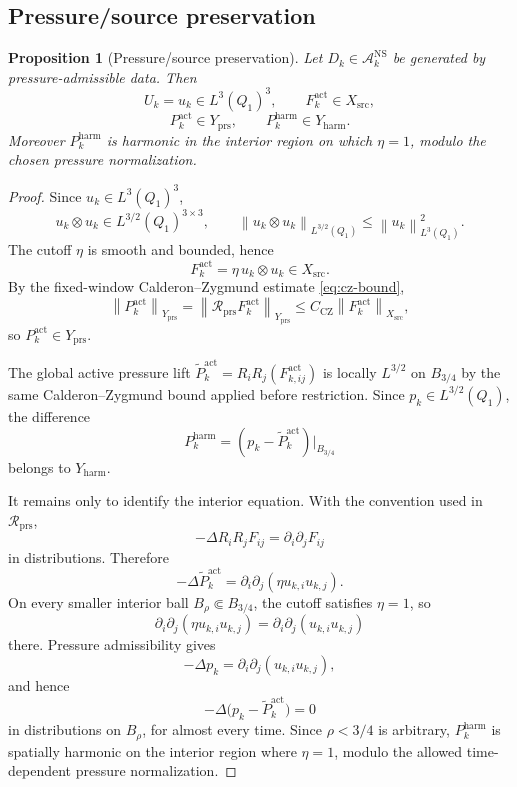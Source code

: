 \documentclass[11pt]{article}
\numberwithin{equation}{section}
\theoremstyle{plain}
\newtheorem{proposition}[theorem]{Proposition}
\theoremstyle{definition}
\theoremstyle{remark}
\newcommand{\NS}{\mathrm{NS}}
\newcommand{\prs}{\mathrm{prs}}
\newcommand{\harm}{\mathrm{harm}}
\newcommand{\A}{\mathcal A}
\newcommand{\Rprs}{\mathcal R_{\prs}}
\newcommand{\norm}[1]{\left\lVert #1\right\rVert}
\begin{document}
\subsection{Pressure/source preservation}

\begin{proposition}[Pressure/source preservation]
\label{prop:pressure-source-preservation}
Let \(D_k\in\A_k^{\NS}\) be generated by pressure-admissible data.  Then
\[
  U_k=u_k\in L^3(Q_1)^3,
  \qquad
  F_k^{\mathrm{act}}\in X_{\mathrm{src}},
\]
\[
  P_k^{\mathrm{act}}\in Y_{\prs},
  \qquad
  P_k^{\harm}\in Y_{\harm}.
\]
Moreover \(P_k^{\harm}\) is harmonic in the interior region on which
\(\eta=1\), modulo the chosen pressure normalization.
\end{proposition}

\begin{proof}
Since \(u_k\in L^3(Q_1)^3\),
\[
  u_k\otimes u_k\in L^{3/2}(Q_1)^{3\times3},
  \qquad
  \norm{u_k\otimes u_k}_{L^{3/2}(Q_1)}
  \le
  \norm{u_k}_{L^3(Q_1)}^2.
\]
The cutoff \(\eta\) is smooth and bounded, hence
\[
  F_k^{\mathrm{act}}=\eta\,u_k\otimes u_k\in X_{\mathrm{src}}.
\]
By the fixed-window Calderon--Zygmund estimate \eqref{eq:cz-bound},
\[
  \norm{P_k^{\mathrm{act}}}_{Y_{\prs}}
  =
  \norm{\Rprs F_k^{\mathrm{act}}}_{Y_{\prs}}
  \le
  C_{\mathrm{CZ}}\norm{F_k^{\mathrm{act}}}_{X_{\mathrm{src}}},
\]
so \(P_k^{\mathrm{act}}\in Y_{\prs}\).

The global active pressure lift
\(\widetilde P_k^{\mathrm{act}}=R_iR_j(F_{k,ij}^{\mathrm{act}})\) is locally
\(L^{3/2}\) on \(B_{3/4}\) by the same Calderon--Zygmund bound applied before
restriction.  Since \(p_k\in L^{3/2}(Q_1)\), the difference
\[
  P_k^{\harm}
  =
  (p_k-\widetilde P_k^{\mathrm{act}})\big|_{B_{3/4}}
\]
belongs to \(Y_{\harm}\).

It remains only to identify the interior equation.  With the convention used
in \(\Rprs\),
\[
  -\Delta R_iR_jF_{ij}=\partial_i\partial_jF_{ij}
\]
in distributions.  Therefore
\[
  -\Delta \widetilde P_k^{\mathrm{act}}
  =
  \partial_i\partial_j(\eta u_{k,i}u_{k,j}).
\]
On every smaller interior ball \(B_\rho\Subset B_{3/4}\), the cutoff satisfies
\(\eta=1\), so
\[
  \partial_i\partial_j(\eta u_{k,i}u_{k,j})
  =
  \partial_i\partial_j(u_{k,i}u_{k,j})
\]
there.  Pressure admissibility gives
\[
  -\Delta p_k=\partial_i\partial_j(u_{k,i}u_{k,j}),
\]
and hence
\[
  -\Delta\bigl(p_k-\widetilde P_k^{\mathrm{act}}\bigr)=0
\]
in distributions on \(B_\rho\), for almost every time.  Since \(\rho<3/4\)
is arbitrary, \(P_k^{\harm}\) is spatially harmonic on the interior region
where \(\eta=1\), modulo the allowed time-dependent pressure normalization.
\end{proof}
\end{document}
